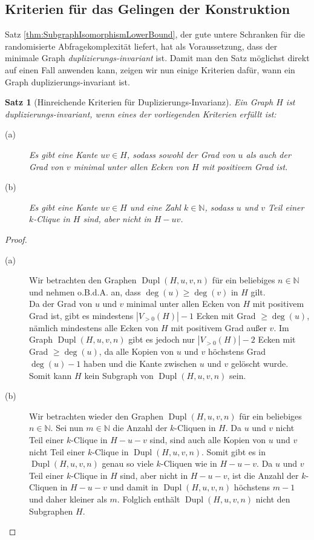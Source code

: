 \documentclass[10pt,a4paper]{scrreprt}
\newtheorem{Satz}[definition]{Satz}
\theoremstyle{definition}
\DeclareMathOperator\Dupl{Dupl}
\begin{document}
\subsection{Kriterien für das Gelingen der Konstruktion}
Satz \ref{thm:SubgraphIsomorphismLowerBound}, der gute
untere Schranken für die randomisierte Abfragekomplexität
liefert, hat als Voraussetzung, dass der minimale Graph
\emph{duplizierungs-invariant} ist. Damit man den 
Satz möglichst direkt auf einen Fall anwenden kann, 
zeigen wir nun einige Kriterien dafür, wann ein
Graph duplizierungs-invariant ist.
\begin{Satz}[Hinreichende Kriterien für Duplizierungs-Invarianz]
\label{thm:KriterienDuplizierungsInvariant}
Ein Graph $H$ ist duplizierungs-invariant, wenn eines
der vorliegenden Kriterien erfüllt ist:
\begin{description}
\item[(a)] Es gibt eine Kante $uv\in H$, sodass sowohl
           der Grad von $u$ als auch der Grad von $v$
           minimal unter allen Ecken von $H$ mit positivem
           Grad ist.
\item[(b)] Es gibt eine Kante $uv \in H$ und eine Zahl
           $k\in \mathbb{N}$, sodass $u$ und $v$
           Teil einer $k$-Clique in $H$ sind, aber nicht
           in $H-uv$.
\end{description}
\end{Satz}
\begin{proof}
\hfill
\begin{description}
\item[(a)] Wir betrachten den Graphen $\Dupl(H,u,v,n)$ für ein
           beliebiges $n\in \mathbb{N}$ und
           nehmen o.B.d.A. an, dass $\deg(u) \geq \deg(v)$ in $H$
           gilt. \\
           Da der Grad von $u$ und $v$ minimal unter allen
           Ecken von $H$ mit positivem Grad ist, gibt es
           mindestens $|V_{>0}(H)| - 1$ Ecken mit Grad $\geq \deg(u)$,
           nämlich mindestens alle Ecken von $H$ mit positivem Grad
           außer $v$.
           Im Graph $\Dupl(H,u,v,n)$ gibt es jedoch nur 
           $|V_{>0}(H)|-2$ Ecken mit Grad $\geq \deg(u)$, da alle
           Kopien von $u$ und $v$ höchstens Grad $\deg(u)-1$ haben
           und die Kante zwischen $u$ und $v$ gelöscht wurde.
           Somit kann $H$ kein Subgraph von $\Dupl(H,u,v,n)$ sein.
\item[(b)] Wir betrachten wieder den Graphen $\Dupl(H,u,v,n)$ für
           ein beliebiges $n\in \mathbb{N}$. Sei nun $m\in \mathbb{N}$
           die Anzahl der $k$-Cliquen in $H$. Da $u$ und $v$ nicht
           Teil einer $k$-Clique in $H-u-v$ sind, sind auch alle
           Kopien von $u$ und $v$ nicht Teil einer $k$-Clique in
           $\Dupl(H,u,v,n)$. Somit gibt es in $\Dupl(H,u,v,n)$ 
           genau so viele $k$-Cliquen wie in $H-u-v$. Da $u$ und
           $v$ Teil einer $k$-Clique in $H$ sind, aber 
           nicht in $H-u-v$, ist die Anzahl der $k$-Cliquen in
           $H-u-v$ und damit in $\Dupl(H,u,v,n)$ höchstens $m-1$
           und daher kleiner als $m$. Folglich enthält $\Dupl(H,u,v,n)$
           nicht den Subgraphen $H$. \qedhere
\end{description}
\end{proof}
\end{document}
